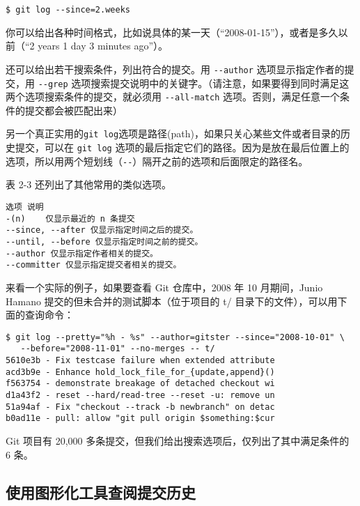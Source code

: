 \documentclass[a4paper]{book}
\begin{document}
\begin{shaded}\begin{verbatim}
$ git log --since=2.weeks
\end{verbatim}\end{shaded}

你可以给出各种时间格式，比如说具体的某一天（“2008-01-15”），或者是多久以前（“2 years 1 day 3 minutes ago”）。

还可以给出若干搜索条件，列出符合的提交。用 \texttt{-{}-author} 选项显示指定作者的提交，用 \texttt{-{}-grep} 选项搜索提交说明中的关键字。（请注意，如果要得到同时满足这两个选项搜索条件的提交，就必须用 \texttt{-{}-all-match} 选项。否则，满足任意一个条件的提交都会被匹配出来）

另一个真正实用的\texttt{git log}选项是路径(path)，如果只关心某些文件或者目录的历史提交，可以在 \texttt{git log} 选项的最后指定它们的路径。因为是放在最后位置上的选项，所以用两个短划线（\texttt{-{}-}）隔开之前的选项和后面限定的路径名。

表 2-3 还列出了其他常用的类似选项。

\begin{shaded}\begin{verbatim}
选项 说明
-(n)	仅显示最近的 n 条提交
--since, --after 仅显示指定时间之后的提交。
--until, --before 仅显示指定时间之前的提交。
--author 仅显示指定作者相关的提交。
--committer 仅显示指定提交者相关的提交。
\end{verbatim}\end{shaded}

来看一个实际的例子，如果要查看 Git 仓库中，2008 年 10 月期间，Junio Hamano 提交的但未合并的测试脚本（位于项目的 t/ 目录下的文件），可以用下面的查询命令：

\begin{shaded}\begin{verbatim}
$ git log --pretty="%h - %s" --author=gitster --since="2008-10-01" \
   --before="2008-11-01" --no-merges -- t/
5610e3b - Fix testcase failure when extended attribute
acd3b9e - Enhance hold_lock_file_for_{update,append}()
f563754 - demonstrate breakage of detached checkout wi
d1a43f2 - reset --hard/read-tree --reset -u: remove un
51a94af - Fix "checkout --track -b newbranch" on detac
b0ad11e - pull: allow "git pull origin $something:$cur
\end{verbatim}\end{shaded}

Git 项目有 20,000 多条提交，但我们给出搜索选项后，仅列出了其中满足条件的 6 条。

\subsection{使用图形化工具查阅提交历史}
\end{document}
